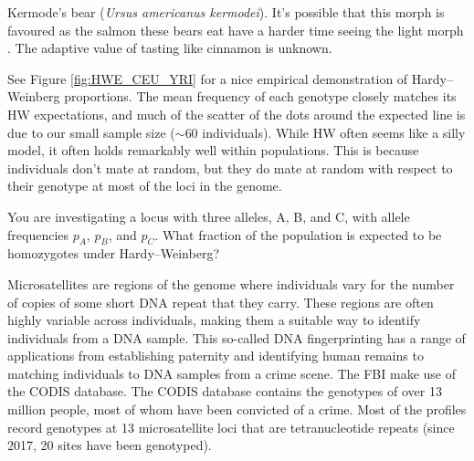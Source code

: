 \begin{marginfigure}
\begin{center}
\end{center}
\caption{Kermode's bear (\textit{Ursus americanus kermodei}). It's
  possible that this morph is favoured as the salmon these bears eat have a harder time
  seeing the light morph \citep{klinka2009adaptive}. The adaptive
  value of tasting like cinnamon is unknown.  } \label{fig:Kermodes_bear}
\end{marginfigure}



See Figure \ref{fig:HWE_CEU_YRI} for a nice
empirical demonstration of Hardy--Weinberg proportions. The mean
frequency of each genotype
closely matches its HW expectations, and much of the scatter of the
dots around the expected line is due to our small sample size ($\sim
60$ individuals). While HW often
seems like a silly model, it often holds remarkably well within
populations. This is because individuals don't mate at random, but they
do mate at random with respect to their genotype at most of the loci
in the genome.

\begin{question}{}
You are investigating a locus with three alleles, A, B, and C, with
allele frequencies $p_A$, $p_B$, and $p_C$. What fraction of the
population is expected to be homozygotes under Hardy--Weinberg?
\end{question}

Microsatellites are regions of the genome where individuals vary for
the number of copies of some short DNA repeat that they carry. These
regions are often highly variable across individuals, making them
a suitable way to identify individuals from a DNA sample. This
so-called DNA fingerprinting has a range of applications from
establishing paternity and identifying human remains to matching
individuals to DNA samples from a crime scene. The FBI make use of the
CODIS database. The CODIS
database contains the genotypes of over 13 million people, most of
whom have been convicted of a crime. Most of
the profiles record genotypes at 13 microsatellite loci that are
tetranucleotide repeats (since 2017, 20 sites have been genotyped).

